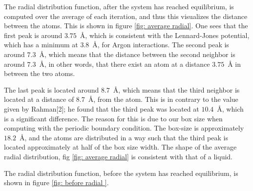 \documentclass[a4paper]{article}
\newcommand{\newparagraph}{\vspace{.5cm}\noindent}
\begin{document}
The radial distribution function, after the system has reached equilibrium, is computed over the average of each iteration, and thus this visualizes the distance between the atoms. This is shown in figure \ref{fig: average radial}.
One sees that the first peak is around $3.75$~Å, which is consistent with the Lennard-Jones potential, which has a minimum at $3.8$~Å, for Argon interactions.
The second peak is around $7.3$~Å, which means that the distance between the second neighbor is around $7.3$~Å, in other words, that there exist an atom at a distance $3.75$~Å in between the two atoms.

\newparagraph
The last peak is located around $8.7$~Å, which means that the third neighbor is located at a distance of $8.7$~Å, from the atom.
This is in contrary to the value given by Rahman[2]; he found that the third peak was located at $10.4$~Å, which is a significant difference. The reason for this is due to our box size when computing with the periodic boundary condition.
The box-size is approximately $18.2$~Å, and the atoms are distributed in a way such that the third peak is located approximately at half of the box size width. The shape of the average radial distribution, fig \ref{fig: average radial} is consistent with that of a liquid.

\newparagraph
The radial distribution function, before the system has reached equilibrium, is shown in figure \ref{fig: before radial }.
\end{document}
